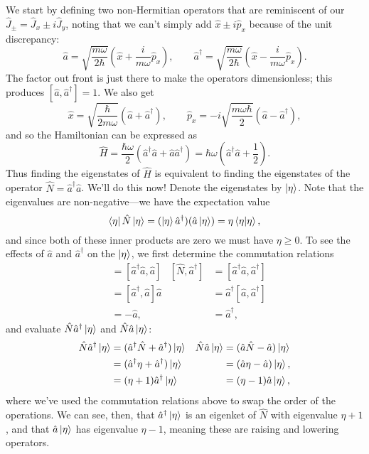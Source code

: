 \documentclass[../p116main.tex]{subfiles}
\begin{document}
We start by defining two non-Hermitian operators that are reminiscent of our $\hat J_\pm = \hat J_x \pm i \hat J_y$, noting that we can't simply add $\hat x \pm i \hat p_x$ because of the unit discrepancy:
\[ \hat a = \sqrt{\frac{m\omega}{2\hbar}} \left( \hat x + \frac{i}{m\omega} \hat p_x \right), \qquad \hat a^\dagger = \sqrt{\frac{m\omega}{2\hbar}} \left( \hat x - \frac{i}{m\omega} \hat p_x \right). \]
The factor out front is just there to make the operators dimensionless; this produces $[\hat a, \hat a^\dagger] = 1$.
We also get
\[ \hat x = \sqrt{\frac{\hbar}{2m\omega}} (\hat a + \hat a^\dagger), \qquad \hat p_x = -i \sqrt{\frac{m\omega \hbar}{2}} (\hat a - \hat a^\dagger), \]
and so the Hamiltonian can be expressed as
\[ \hat H = \frac{\hbar \omega}{2} (\hat a^\dagger \hat a + \hat a \hat a^\dagger) = \hbar \omega \left( \hat a^\dagger \hat a + \frac{1}{2} \right). \]
Thus finding the eigenstates of $\hat H$ is equivalent to finding the eigenstates of the operator $\hat N = \hat a^\dagger \hat a$.
We'll do this now!
Denote the eigenstates by $\left| \eta \right>$.
Note that the eigenvalues are non-negative---we have the expectation value
\[ \left< \eta \right| \hat N \left| \eta \right> = (\left| \eta \right> \hat a^\dagger) (\hat a \left| \eta \right>) = \eta \left< \eta \middle| \eta \right>, \]
and since both of these inner products are zero we must have $\eta \geq 0$.
To see the effects of $\hat a$ and $\hat a^\dagger$ on the $\left| \eta \right>$, we first determine the commutation relations
\begin{align*}
    [\hat N, \hat a] &= [\hat a^\dagger \hat a, \hat a] & [\hat N, \hat a^\dagger] &= [\hat a^\dagger \hat a, \hat a^\dagger] \\
    &= [\hat a^\dagger, \hat a] \hat a &&= \hat a^\dagger [\hat a, \hat a^\dagger] \\
    &= -\hat a, &&= \hat a^\dagger,
\end{align*}
and evaluate $\hat N \hat a^\dagger \left| \eta \right>$ and $\hat N \hat a \left| \eta \right>$:
\begin{align*}
    \hat N \hat a^\dagger \left| \eta \right> &= (\hat a^\dagger \hat N + \hat a^\dagger) \left| \eta \right> & \hat N \hat a \left| \eta \right> &= (\hat a \hat N - \hat a) \left| \eta \right> \\
    &= (\hat a^\dagger \eta + \hat a^\dagger) \left| \eta \right> &&= (\hat a \eta - \hat a) \left| \eta \right>, \\
    &= (\eta + 1) \hat a^\dagger \left| \eta \right> &&= (\eta - 1) \hat a \left| \eta \right>,
\end{align*}
where we've used the commutation relations above to swap the order of the operations.
We can see, then, that $\hat a^\dagger \left| \eta \right>$ is an eigenket of $\hat N$ with eigenvalue $\eta + 1$, and that $\hat a \left| \eta \right>$ has eigenvalue $\eta - 1$, meaning these are raising and lowering operators.
\end{document}
